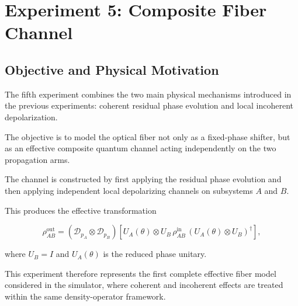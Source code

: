 
\newpage

\section{Experiment 5: Composite Fiber Channel}


\subsection*{Objective and Physical Motivation}

The fifth experiment combines the two main physical mechanisms introduced in the previous experiments: coherent residual phase evolution and local incoherent depolarization.

The objective is to model the optical fiber not only as a fixed-phase shifter, but as an effective composite quantum channel acting independently on the two propagation arms.

The channel is constructed by first applying the residual phase evolution and then applying independent local depolarizing channels on subsystems \( A \) and \( B \).

This produces the effective transformation

\begin{equation}
\rho_{AB}^{\mathrm{out}}
=
\left(
\mathcal{D}_{p_A}
\otimes
\mathcal{D}_{p_B}
\right)
\left[
U_A(\theta)
\otimes
U_B
\,
\rho_{AB}^{\mathrm{in}}
\,
\left(
U_A(\theta)
\otimes
U_B
\right)^{\dagger}
\right],
\label{eq:experiment5_composite_channel}
\end{equation}

where \( U_B = I \) and \( U_A(\theta) \) is the reduced phase unitary.

This experiment therefore represents the first complete effective fiber model considered in the simulator, where coherent and incoherent effects are treated within the same density-operator framework.


